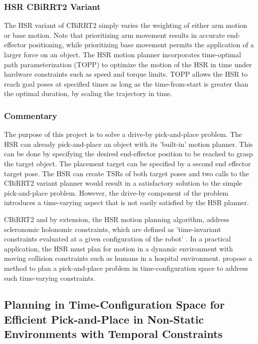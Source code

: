 \documentclass[12pt]{article}
\begin{document}
        \subsubsection{HSR CBiRRT2 Variant}
            The HSR variant of CBiRRT2 simply varies the weighting of either arm motion or base motion. \cite{yamamoto_development_2019} Note that prioritizing arm movement results in accurate end-effector positioning, while prioritizing base movement permits the application of a larger force on an object. The HSR motion planner incorporates time-optimal path parameterization (TOPP)\cite{yamamoto_development_2019} to optimize the motion of the HSR in time under hardware constraints such as speed and torque limits. TOPP allows the HSR to reach goal poses at specified times as long as the time-from-start is greater than the optimal duration, by scaling the trajectory in time.

        \subsubsection{Commentary}
            The purpose of this project is to solve a drive-by pick-and-place problem. The HSR can already pick-and-place an object with its 'built-in' motion planner. This can be done by specifying the desired end-effector position to be reached to grasp the target object. The placement target can be specified by a second end effector target pose. The HSR can create TSRs of both target poses and two calls to the CBiRRT2 variant planner would result in a satisfactory solution to the simple pick-and-place problem. However, the drive-by component of the problem introduces a time-varying aspect that is not easily satisfied by the HSR planner.

            \par CBiRRT2 and by extension, the HSR motion planning algorithm, address scleronomic holonomic constraints, which are defined as 'time-invariant constraints evaluated at a given configuration of the robot' \cite{berenson_pose-constrained_2009}. In a practical application, the HSR must plan for motion in a dynamic environment with moving collision constraints such as humans in a hospital environment. \cite{yang_planning_2018} propose a method to plan a pick-and-place problem in time-configuration space to address such time-varying constraints.

    \subsection{Planning in Time-Configuration Space for Efficient Pick-and-Place in Non-Static Environments with Temporal Constraints}
\end{document}
